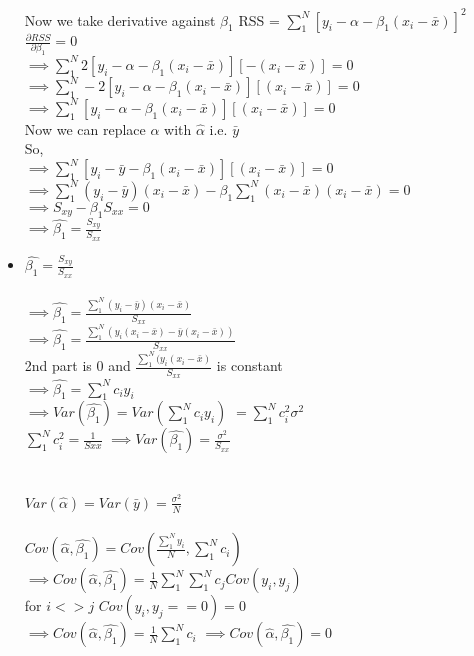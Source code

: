 \documentclass{article}
\begin{document}
\begin{itemize}
		Now we take derivative against $\beta_{1}$
		RSS = $\sum_{1}^{N}[y_{i}-\alpha-\beta_{1}(x_{i}-\bar{x})]^2$\\
		$\frac{\partial RSS}{\partial \beta_{1}} = 0$\\
		$\implies \sum_{1}^{N} 2[y_{i}-\alpha-\beta_{1}(x_{i}-\bar{x})][-(x_{i}-\bar{x})] =0$\\		
		$\implies \sum_{1}^{N} -2[y_{i}-\alpha-\beta_{1}(x_{i}-\bar{x})][(x_{i}-\bar{x})] =0$\\		
		$\implies \sum_{1}^{N} [y_{i}-\alpha-\beta_{1}(x_{i}-\bar{x})][(x_{i}-\bar{x})] =0$\\		
		Now we can replace $\alpha$ with $\hat{\alpha}$ i.e. $\bar{y}$\\
		So,\\
		$\implies \sum_{1}^{N} [y_{i}-\bar{y}-\beta_{1}(x_{i}-\bar{x})][(x_{i}-\bar{x})] =0$\\		
		$\implies \sum_{1}^{N} (y_{i}-\bar{y})(x_{i}-\bar{x}) -\beta_{1}\sum_{1}^{N}(x_{i}-\bar{x})(x_{i}-\bar{x}) =0$\\		
		$\implies S_{xy} - \beta_{1}S_{xx}=0$\\
		$\implies \hat{\beta_{1}} = \frac{S_{xy}}{S_{xx}}$
		\item $\hat{\beta_{1}} = \frac{S_{xy}}{S_{xx}}$ \\\\
		$\implies \hat{\beta_{1}} = \frac{\sum_{1}^{N} (y_{i}-\bar{y})(x_{i}-\bar{x})}{S_{xx}}$\\
		$\implies \hat{\beta_{1}} = \frac{\sum_{1}^{N} (y_{i}(x_{i}-\bar{x})-\bar{y}(x_{i}-\bar{x}))}{S_{xx}}$\\	
		2nd part is 0 and $\frac{\sum_{1}^{N} (y_{i}(x_{i}-\bar{x})}{S_{xx}}$ is constant\\
		$\implies \hat{\beta_{1}} = \sum_{1}^{N} c_{i}y_{i}$\\
		$\implies Var(\hat{\beta_{1}}) = Var(\sum_{1}^{N} c_{i}y_{i})$ 
		$=\sum_{1}^{N} c_{i}^2\sigma^2$\\
		$\sum_{1}^{N} c_{i}^2 = \frac{1}{Sxx}$
		$\implies Var(\hat{\beta_{1}}) = \frac{\sigma^2}{S_{xx}}$
		\\
		\\
		\\
		$Var(\hat{\alpha}) = Var(\bar{y}) = \frac{\sigma^2}{N}$
		\\
		\\
		$Cov(\hat{\alpha} ,\hat{\beta_{1}})=Cov(\frac{\sum_{1}^{N} y_{i}}{N},\sum_{1}^{N} c_{i})$\\
		$\implies Cov(\hat{\alpha},\hat{\beta_{1}}) = \frac{1}{N} \sum_{1}^{N}\sum_{1}^{N}c_{j}Cov(y_{i},y_{j}) $\\
		for $i<>j$ $Cov(y_{i},y_{j}==0) = 0$\\
		$\implies Cov(\hat{\alpha},\hat{\beta_{1}}) = \frac{1}{N} \sum_{1}^{N}c_{i}$
		$\implies Cov(\hat{\alpha},\hat{\beta_{1}}) = 0$
	\end{itemize}
\end{document}
